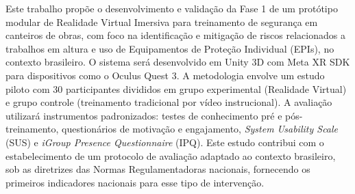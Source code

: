 Este trabalho propõe o desenvolvimento e validação da Fase 1 de um protótipo modular de Realidade Virtual Imersiva para treinamento de segurança em canteiros de obras, com foco na identificação e mitigação de riscos relacionados a trabalhos em altura e uso de Equipamentos de Proteção Individual (EPIs), no contexto brasileiro. O sistema será desenvolvido em Unity 3D com Meta XR SDK para dispositivos como o Oculus Quest 3. A metodologia envolve um estudo piloto com 30 participantes divididos em grupo experimental (Realidade Virtual) e grupo controle (treinamento tradicional por vídeo instrucional). A avaliação utilizará instrumentos padronizados: testes de conhecimento pré e pós-treinamento, questionários de motivação e engajamento, \textit{System Usability Scale} (SUS) e \textit{iGroup Presence Questionnaire} (IPQ). Este estudo contribui com o estabelecimento de um protocolo de avaliação adaptado ao contexto brasileiro, sob as diretrizes das Normas Regulamentadoras nacionais, fornecendo os primeiros indicadores nacionais para esse tipo de intervenção.


